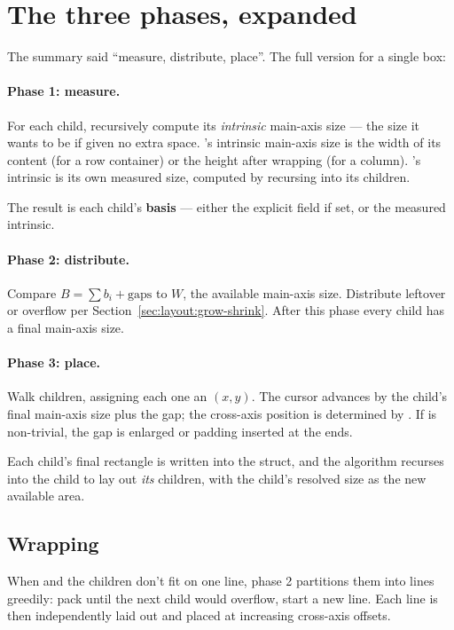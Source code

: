 \section{The three phases, expanded}
\label{sec:layout:phases}

The summary said ``measure, distribute, place''. The full version
for a single box:

\paragraph{Phase 1: measure.}
For each child, recursively compute its \emph{intrinsic} main-axis
size --- the size it wants to be if given no extra space.
's intrinsic main-axis size is the width of its
content (for a row container) or the height after wrapping (for a
column). 's intrinsic is its own measured size,
computed by recursing into its children.

The result is each child's \textbf{basis} --- either the explicit
 field if set, or the measured intrinsic.

\paragraph{Phase 2: distribute.}
Compare $B = \sum b_i + \text{gaps}$ to $W$, the available
main-axis size. Distribute leftover or overflow per
Section~\ref{sec:layout:grow-shrink}. After this phase every
child has a final main-axis size.

\paragraph{Phase 3: place.}
Walk children, assigning each one an $(x, y)$. The cursor advances
by the child's final main-axis size plus the gap; the cross-axis
position is determined by . If  is
non-trivial, the gap is enlarged or padding inserted at the ends.

Each child's final  rectangle is written into the
 struct, and the algorithm recurses into the
child to lay out \emph{its} children, with the child's resolved
size as the new available area.

\subsection{Wrapping}

When  and the children don't fit on one line,
phase 2 partitions them into lines greedily: pack until the next
child would overflow, start a new line. Each line is then
independently laid out and placed at increasing cross-axis offsets.

